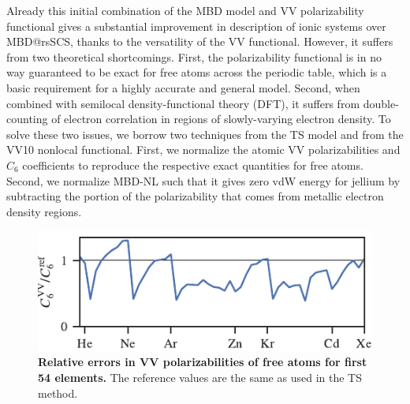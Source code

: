 Already this initial combination of the MBD model and VV polarizability functional gives a substantial improvement in description of ionic systems over MBD@rsSCS, thanks to the versatility of the VV functional.
However, it suffers from two theoretical shortcomings.
First, the polarizability functional is in no way guaranteed to be exact for free atoms across the periodic table, which is a basic requirement for a highly accurate and general model.
Second, when combined with semilocal density-functional theory (DFT), it suffers from double-counting of electron correlation in regions of slowly-varying electron density.
To solve these two issues, we borrow two techniques from the TS model and from the VV10 nonlocal functional.
First, we normalize the atomic VV polarizabilities and $C_6$ coefficients to reproduce the respective exact quantities for free atoms.
Second, we normalize MBD-NL such that it gives zero vdW energy for jellium by subtracting the portion of the polarizability that comes from metallic electron density regions.


\begin{figure}[t!]
\centering
\includegraphics{../media/vv-periodic-table.pdf}
\caption{\textbf{Relative errors in VV polarizabilities of free atoms for first 54 elements.}
The reference values are the same as used in the TS method.
}\label{fig:vv-periodic-table}
\end{figure}


